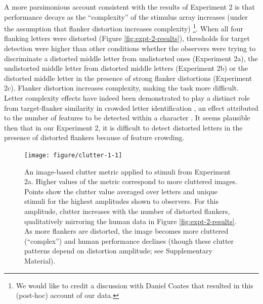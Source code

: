 \documentclass[doc, 11pt,a4paper,natbib]{apa6}\usepackage[]{graphicx}\usepackage[]{color}
\newenvironment{knitrout}{}{} %
\begin{document}
A more parsimonious account consistent with the results of Experiment 2 is that performance decays as the ``complexity'' of the stimulus array increases (under the assumption that flanker distortion increases complexity)
\footnote{We would like to credit a discussion with Daniel Coates that resulted in this (post-hoc) account of our data.}.
When all four flanking letters were distorted (Figure \ref{fig:expt-2-results}), thresholds for target detection were higher than other conditions whether the observers were trying to discriminate a distorted middle letter from undistorted ones (Experiment 2a), the undistorted middle letter from distorted middle letters (Experiment 2b) or the distorted middle letter in the presence of strong flanker distortions (Experiment 2c).
Flanker distortion increases complexity, making the task more difficult.
Letter complexity effects have indeed been demonstrated to play a distinct role from target-flanker similarity in crowded letter identification \citep{bernard_dependence_2011}, an effect attributed to the number of features to be detected within a character \citep[see also][]{pelli_feature_2006, suchow_learning_2012}.
It seems plausible then that in our Experiment 2, it is difficult to detect distorted letters in the presence of distorted flankers because of feature crowding.



\begin{knitrout}
\color{fgcolor}\begin{figure}
\texttt{[image: figure/clutter-1-1]} \caption{An image-based clutter metric \citep[feature congestion;][]{rosenholtz_measuring_2007} applied to stimuli from Experiment 2a.
Higher values of the metric correspond to more cluttered images.
Points show the clutter value averaged over letters and unique stimuli for the highest amplitudes shown to observers.
For this amplitude, clutter increases with the number of distorted flankers, qualitatively mirroring the human data in Figure \ref{fig:expt-2-results}.
As more flankers are distorted, the image becomes more cluttered (``complex'') and human performance declines (though these clutter patterns depend on distortion amplitude; see Supplementary Material).
}\label{fig:clutter-1}
\end{figure}


\end{knitrout}
\end{document}
